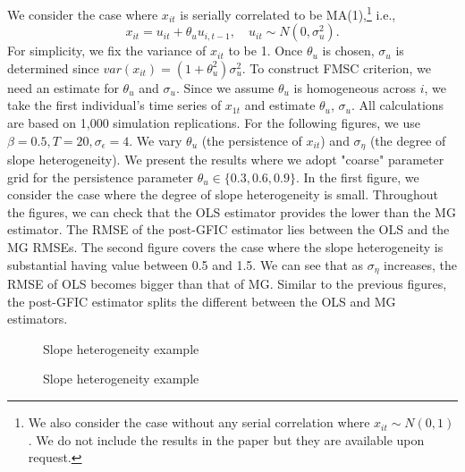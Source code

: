 We consider the case where $x_{it}$ is serially correlated to be MA(1),\footnote{We also consider the case without any serial correlation where $x_{it} \sim N(0,1)$. We do not include the results in the paper but they are available upon request.} i.e., 
\[
x_{it} = u_{it} + \theta_u u_{i,t-1}, \quad u_{it} \sim N(0, \sigma_u^2).
\]
 For simplicity, we fix the variance of $x_{it}$ to be 1. Once $\theta_u$ is chosen, $\sigma_u$ is determined since $var(x_{it}) = (1+\theta_u^2)\sigma_u^2.$ To construct FMSC criterion, we need an estimate for $\theta_u$ and $\sigma_u$. Since we assume $\theta_u$ is homogeneous across $i$, we take the first individual's time series of $x_{1t}$ and estimate $\theta_u$, $\sigma_u$. All calculations are based on 1,000 simulation replications. For the following figures, we use $\beta = 0.5, T = 20, \sigma_\epsilon = 4$. We vary $\theta_u$ (the persistence of $x_{it}$) and $\sigma_\eta$ (the degree of slope heterogeneity). We present the results where we adopt "coarse" parameter grid for the persistence parameter $\theta_u \in \{0.3, 0.6, 0.9\}$. In the first figure, we consider the case where the degree of slope heterogeneity is small. Throughout the figures, we can check that the OLS estimator provides the lower than the MG estimator. The RMSE of the post-GFIC estimator lies between the OLS and the MG RMSEs. The second figure covers the case where the slope heterogeneity is substantial having value between 0.5 and 1.5. We can see that as $\sigma_\eta$ increases, the RMSE of OLS becomes bigger than that of MG. Similar to the previous figures, the post-GFIC estimator splits the different between the OLS and MG estimators.

\begin{figure}
  
  \caption{Slope heterogeneity example}
\end{figure}

\begin{figure}
  
  \caption{Slope heterogeneity example}
\end{figure}
